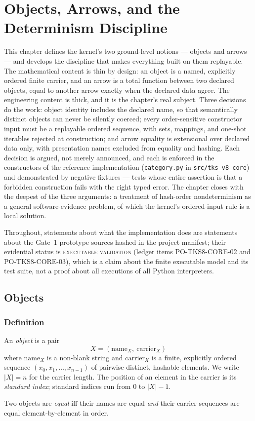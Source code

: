 \chapter{Objects, Arrows, and the Determinism Discipline}\label{ch03:chap}

This chapter defines the kernel's two ground-level notions --- objects and
arrows --- and develops the discipline that makes everything built on them
replayable. The mathematical content is thin by design: an object is a named,
explicitly ordered finite carrier, and an arrow is a total function between
two declared objects, equal to another arrow exactly when the declared data
agree. The engineering content is thick, and it is the chapter's real
subject. Three decisions do the work: object identity includes the declared
name, so that semantically distinct objects can never be silently coerced;
every order-sensitive constructor input must be a replayable ordered
sequence, with sets, mappings, and one-shot iterables rejected at
construction; and arrow equality is extensional over declared data only, with
presentation names excluded from equality and hashing. Each decision is
argued, not merely announced, and each is enforced in the constructors of the
reference implementation (\texttt{category.py} in \texttt{src/tks\_v8\_core})
and demonstrated by negative fixtures --- tests whose entire assertion is
that a forbidden construction fails with the right typed error. The chapter
closes with the deepest of the three arguments: a treatment of hash-order
nondeterminism as a general software-evidence problem, of which the kernel's
ordered-input rule is a local solution.

Throughout, statements about what the implementation does are statements
about the Gate~1 prototype sources hashed in the project manifest; their
evidential status is \textsc{executable validation} (ledger items
PO-TKS8-CORE-02 and PO-TKS8-CORE-03), which is a claim about the finite
executable model and its test suite, not a proof about all executions of all
Python interpreters.

\section{Objects}\label{ch03:sec:objects}

\subsection{Definition}

\begin{definition}\label{ch03:def:object}
An \emph{object} is a pair
\[
X = (\mathrm{name}_X,\ \mathrm{carrier}_X)
\]
where $\mathrm{name}_X$ is a non-blank string and $\mathrm{carrier}_X$ is a
finite, explicitly ordered sequence $(x_0, x_1, \dots, x_{n-1})$ of pairwise
distinct, hashable elements. We write $|X| = n$ for the carrier length. The
position of an element in the carrier is its \emph{standard index}; standard
indices run from $0$ to $|X| - 1$.

Two objects are \emph{equal} iff their names are equal \emph{and} their
carrier sequences are equal element-by-element in order.
\end{definition}

